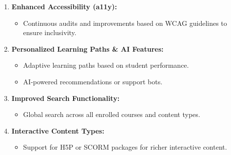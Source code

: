 \documentclass[12pt,a4paper]{article}
\begin{document}
\begin{enumerate}
    \item \textbf{Enhanced Accessibility (a11y):}
    \begin{itemize}
        \item Continuous audits and improvements based on WCAG guidelines to ensure inclusivity.
    \end{itemize}
    \item \textbf{Personalized Learning Paths \& AI Features:}
    \begin{itemize}
        \item Adaptive learning paths based on student performance.
        \item AI-powered recommendations or support bots.
    \end{itemize}
    \item \textbf{Improved Search Functionality:}
    \begin{itemize}
        \item Global search across all enrolled courses and content types.
    \end{itemize}
    \item \textbf{Interactive Content Types:}
    \begin{itemize}
        \item Support for H5P or SCORM packages for richer interactive content.
    \end{itemize}
\end{enumerate}
\end{document}
